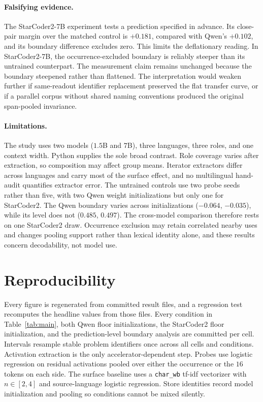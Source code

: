 \documentclass{article}
\begin{document}
\paragraph{Falsifying evidence.} The StarCoder2-7B experiment tests a
prediction specified in advance. Its close-pair margin over the matched
control is $+0.181$, compared with Qwen's $+0.102$, and its boundary difference
excludes zero. This limits the deflationary reading. In StarCoder2-7B, the
occurrence-excluded boundary is reliably steeper than its untrained
counterpart. The measurement claim remains unchanged because the boundary
steepened rather than flattened. The interpretation would weaken
further if same-readout identifier replacement preserved the flat transfer
curve, or if a parallel corpus without shared naming conventions produced the
original span-pooled invariance.

\paragraph{Limitations.}
The study uses two models ($1.5$B and $7$B), three languages, three roles,
and one context width. Python supplies the sole broad contrast. Role coverage
varies after extraction, so composition may affect group means. Iterator
extractors differ across languages and carry most of the surface effect, and no
multilingual hand-audit quantifies extractor error. The untrained controls use
two probe seeds rather than five, with two Qwen weight initializations but only
one for StarCoder2. The Qwen boundary varies across
initializations ($-0.064$, $-0.035$), while its level does not ($0.485$,
$0.497$). The cross-model comparison therefore rests on one StarCoder2 draw.
Occurrence exclusion may retain correlated nearby uses and changes pooling
support rather than lexical identity alone, and these results concern
decodability, not model use.




\appendix
\raggedbottom


\FloatBarrier
{}
\section{Reproducibility}
\label{app:repro}
Every figure is regenerated from committed result files, and a regression test
recomputes the headline values from those files. Every condition in
Table~\ref{tab:main}, both Qwen floor initializations, the StarCoder2 floor
initialization, and the prediction-level boundary analysis are committed per
cell. Intervals resample stable problem identifiers once across all cells and
conditions. Activation extraction is the only accelerator-dependent step.
Probes use logistic regression on residual activations pooled over either the
occurrence or the $16$ tokens on each side. The surface baseline uses a
\texttt{char\_wb} tf-idf vectorizer with $n \in [2,4]$ and source-language
logistic regression. Store identities record model initialization and pooling
so conditions cannot be mixed silently.
\end{document}
